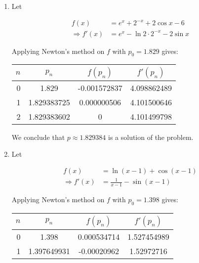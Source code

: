 \documentclass[../../../../Assignments]{subfiles}
\begin{document}
\begin{solution}
    \begin{enumerate}[label = \alph*)]
        \item Let

            \begin{align*}
                             f(x) &= e^x + 2^{-x} + 2 \cos{x} - 6 \\
                \Rightarrow f'(x) &= e^x - \ln{2} \cdot 2^{-x} - 2 \sin{x}
            \end{align*}

            Applying Newton's method on \(f\) with \(p_0 = \num{1.829}\) gives:

            \begin{table}[H]
                \centering
                \begin{tabular}{r S[table-format=1.9] S[table-format=-1.9] S[table-format=1.9]}
                    \toprule
                    \(n\)  &   {\(p_n\)}   &  {\(f(p_n)\)}  &  {\(f'(p_n)\)}  \\
                      &  1.829        &  -0.001572837  &  4.098862489    \\
                        1  &  1.829383725  &   0.000000506  &  4.101500646    \\
                        2  &  1.829383602  &   0            &  4.101499798    \\
                    \bottomrule
                \end{tabular}
            \end{table}

            We conclude that \(p \approx \num{1.829384}\) is a solution of the
            problem.

        \item Let

            \begin{align*}
                             f(x) &= \ln(x - 1) + \cos(x - 1) \\
                \Rightarrow f'(x) &= \frac{1}{x - 1} - \sin(x - 1)
            \end{align*}

            Applying Newton's method on \(f\) with \(p_0 = \num{1.398}\) gives:

            \begin{table}[H]
                \centering
                \begin{tabular}{r S[table-format=1.9] S[table-format=-1.9] S[table-format=1.9]}
                    \toprule
                    \(n\)  &   {\(p_n\)}   &  {\(f(p_n)\)}  &  {\(f'(p_n)\)}  \\
                      &  1.398        &   0.000534714  &  1.527454989    \\
                        1  &  1.397649931  &  -0.00020962   &  1.52972716     \\
                    \bottomrule
                \end{tabular}
            \end{table}


\end{enumerate}
\end{solution}
\end{document}
